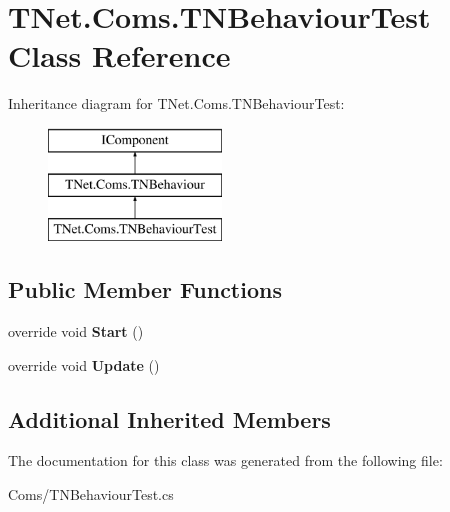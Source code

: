 \hypertarget{class_t_net_1_1_coms_1_1_t_n_behaviour_test}{}\section{T\+Net.\+Coms.\+T\+N\+Behaviour\+Test Class Reference}
\label{class_t_net_1_1_coms_1_1_t_n_behaviour_test}
Inheritance diagram for T\+Net.\+Coms.\+T\+N\+Behaviour\+Test\+:\begin{figure}[H]
\begin{center}
\leavevmode
\includegraphics[height=3.000000cm]{class_t_net_1_1_coms_1_1_t_n_behaviour_test}
\end{center}
\end{figure}
\subsection*{Public Member Functions}
\begin{DoxyCompactItemize}
\item 
\mbox{\label{class_t_net_1_1_coms_1_1_t_n_behaviour_test_a894a24fecdee6c1d1a0e3af9ecdcb162}} 
override void {\bfseries Start} ()
\item 
\mbox{\label{class_t_net_1_1_coms_1_1_t_n_behaviour_test_a22ec08bdac1ed2808dd9cf34ead5c25d}} 
override void {\bfseries Update} ()
\end{DoxyCompactItemize}
\subsection*{Additional Inherited Members}


The documentation for this class was generated from the following file\+:\begin{DoxyCompactItemize}
\item 
Coms/T\+N\+Behaviour\+Test.\+cs\end{DoxyCompactItemize}
